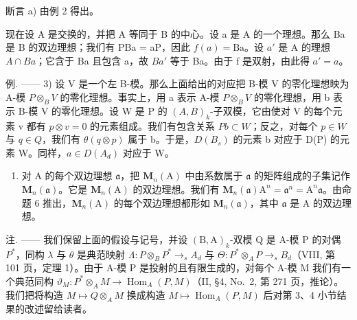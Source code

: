 断言 a) 由例 2 得出。

现在设 A 是交换的，并把 A 等同于 B 的中心。设 a 是 A 的一个理想。那么 Ba 是 B 的双边理想；我们有 PBa = aP，因此 \(f(a) = \text{Ba}\)。设 \(a'\) 是 A 的理想 \(A \cap Ba\)；它含于 Ba 且包含 a，故 \(Ba'\) 等于 Ba。由于 f 是双射，由此得 \(a' = a\)。

例. —— 3) 设 V 是一个左 B-模。那么上面给出的对应把 B-模 V 的零化理想映为 A-模 \(P \otimes_{B} V\) 的零化理想。事实上，用 a 表示 A-模 \(P \otimes_{B} V\) 的零化理想，用 b 表示 B-模 V 的零化理想。设 W 是 P 的 \((A, B)_{k}\)-子双模，它由使对 V 的每个元素 v 都有 \(p \otimes v = 0\) 的元素组成。我们有包含关系 \(Pb \subset W\)；反之，对每个 \(p \in W\) 与 \(q \in Q\)，我们有 \(\theta(q \otimes p)\) 属于 b。于是，\(D(B_s)\) 的元素 b 对应于 D(P) 的元素 W。同样，\(a \in D(A_d)\) 对应于 W。

\begin{enumerate}
\def\labelenumi{\arabic{enumi})}
\setcounter{enumi}{3}
\tightlist
\item
  对 A 的每个双边理想 \(\mathfrak{a}\)，把 \(\mathbf{M}_n(\mathrm{A})\) 中由系数属于 \(\mathfrak{a}\) 的矩阵组成的子集记作 \(\mathbf{M}_n(\mathfrak{a})\)。它是 \(\mathbf{M}_n(\mathrm{A})\) 的双边理想。我们有 \(\mathbf{M}_n(\mathfrak{a})\mathrm{A}^n = \mathfrak{a}^n = \mathrm{A}^n\mathfrak{a}\)。由命题 6 推出，\(\mathbf{M}_n(\mathrm{A})\) 的每个双边理想都形如 \(\mathbf{M}_n(\mathfrak{a})\)，其中 \(\mathfrak{a}\) 是 A 的双边理想。
\end{enumerate}

注. —— 我们保留上面的假设与记号，并设 \((\mathrm{B},\mathrm{A})_{k}\)-双模 Q 是 A-模 P 的对偶 \(P^{*}\)，同构 \(\lambda\) 与 \(\theta\) 是典范映射 \(\Lambda:P\otimes_{B}P^{*}\to_{s}A_{d}\) 与 \(\Theta:P^{*}\otimes_{A}P\to_{s}B_{d}\)（VIII, 第 101 页，定理 1）。由于 A-模 P 是投射的且有限生成的，对每个 A-模 M 我们有一个典范同构 \(\vartheta_{M}:P^{*}\otimes_{A}M\to\operatorname{Hom}_{A}(P,M)\)（II, §4, No.~2, 第 271 页，推论）。我们把将构造 \(M\mapsto Q\otimes_{A}M\) 换成构造 \(M\mapsto\operatorname{Hom}_{A}(P,M)\) 后对第 3、4 小节结果的改述留给读者。

